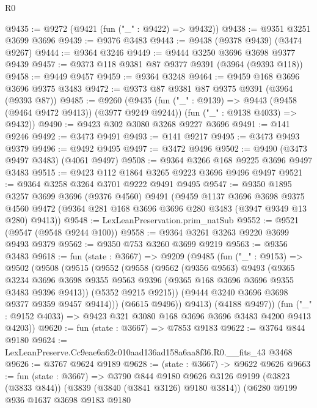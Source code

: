 \begin{lexlean}{R0}
\begin{coremodule}
@9435 := @9272 (@9421 (fun ("_" : @9422) => @9432))
@9438 := @9351 @3251 @3699 @3696
@9439 := @9376 @3483
@9443 := @9438 (@9378 @9439) (@3474 @9267)
@9444 := @9364 @3246
@9449 := @9444 @3250 @3696 @3698 @9377 @9439
@9457 := @9373 @118 @9381 @87 @9377 @9391 (@3964 (@9393 @118))
@9458 := @9449 @9457
@9459 := @9364 @3248
@9464 := @9459 @168 @3696 @3696 @9375 @3483
@9472 := @9373 @87 @9381 @87 @9375 @9391 (@3964 (@9393 @87))
@9485 := @9260
    (@9435
      (fun ("_" : @9139) => @9443 (@9458 (@9464 @9472 @9413)) (@3977 @9249 @9244))
      (fun ("_" : @9138 @4033) => @9432))
@9490 := @9423 @302 @3080 @3268 @9227 @3696
@9491 := @141 @9246
@9492 := @3473 @9491
@9493 := @141 @9217
@9495 := @3473 @9493 @9379
@9496 := @9492 @9495
@9497 := @3472 @9496
@9502 := @9490 (@3473 @9497 @3483) (@4061 @9497)
@9508 := @9364 @3266 @168 @9225 @3696 @9497 @3483
@9515 := @9423 @112 @1864 @3265 @9223 @3696 @9496 @9497
@9521 := @9364 @3258 @3264 @3701 @9222 @9491 @9495
@9547 := @9350
    @1895
    @3257
    @3699
    @3696
    (@9376 @4560)
    @9491
    (@9459
      @1137
      @3696
      @3698
      @9375
      @4560
      @9472
      (@9364 @281 @168 @3696 @3696 @280 @3483 (@3947 @9349 @13 @280) @9413))
@9548 := LexLeanPreservation.prim_natSub
@9552 := @9521 (@9547 (@9548 @9244 @100))
@9558 := @9364 @3261 @3263 @9220 @3699 @9493 @9379
@9562 := @9350 @753 @3260 @3699 @9219
@9563 := @9356 @3483
@9618 := fun (state : @3667) =>
  @9209
    (@9485
      (fun ("_" : @9153) =>
      @9502
        (@9508
          (@9515
            (@9552
              (@9558
                (@9562
                  (@9356 @9563)
                  @9493
                  (@9365
                    @3234
                    @3696
                    @3698
                    @9355
                    @9563
                    @9396
                    (@9365 @168 @3696 @3696 @9355 @3483 @9396 @9413))
                  (@5352 @9215 @9215))
                (@9444 @3240 @3696 @3698 @9377 @9359 @9457 @9414)))
            (@6615 @9496))
          @9413)
        (@4188 @9497))
      (fun ("_" : @9152 @4033) => @9423 @321 @3080 @168 @3696 @3696 @3483 @4200 @9413 @4203))
@9620 := fun (state : @3667) => @7853 @9183
@9622 := @3764 @844 @9180
@9624 := LexLeanPreserve.Cc9eae6a62c010aad136ad158a6aa8f36.R0.__fits_43 @3468
@9626 := @3767 @9624 @9189
@9628 := (state : @3667) -> @9622 @9626
@9663 := fun (state : @3667) =>
  @3790
    @844
    @9180
    @9626
    @3126
    @9199
    (@3823 (@3833 @844))
    (@3839 (@3840 (@3841 @3126) @9180 @3814))
    (@6280
      @9199
      @936
      @1637
      @3698
      @9183
      @9180

\end{coremodule}
\end{lexlean}
